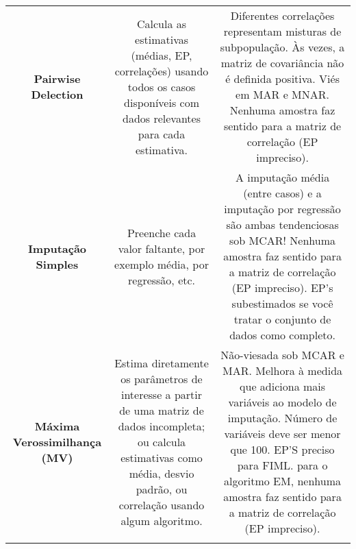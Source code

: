\documentclass[
]{book}
\begin{document}
\begin{longtable}[]{@{}ccc@{}}
\begin{minipage}[t]{0.30\columnwidth}\centering
\textbf{Pairwise Delection}\strut
\end{minipage} & \begin{minipage}[t]{0.30\columnwidth}\centering
Calcula as estimativas (médias, EP, correlações) usando todos os casos disponíveis com dados relevantes para cada estimativa.\strut
\end{minipage} & \begin{minipage}[t]{0.30\columnwidth}\centering
Diferentes correlações representam misturas de subpopulação. Às vezes, a matriz de covariância não é definida positiva. Viés em MAR e MNAR. Nenhuma amostra faz sentido para a matriz de correlação (EP impreciso).\strut
\end{minipage}\tabularnewline
\begin{minipage}[t]{0.30\columnwidth}\centering
\textbf{Imputação Simples}\strut
\end{minipage} & \begin{minipage}[t]{0.30\columnwidth}\centering
Preenche cada valor faltante, por exemplo média, por regressão, etc.\strut
\end{minipage} & \begin{minipage}[t]{0.30\columnwidth}\centering
A imputação média (entre casos) e a imputação por regressão são ambas tendenciosas sob MCAR! Nenhuma amostra faz sentido para a matriz de correlação (EP impreciso). EP's subestimados se você tratar o conjunto de dados como completo.\strut
\end{minipage}\tabularnewline
\begin{minipage}[t]{0.30\columnwidth}\centering
\textbf{Máxima Verossimilhança (MV)}\strut
\end{minipage} & \begin{minipage}[t]{0.30\columnwidth}\centering
Estima diretamente os parâmetros de interesse a partir de uma matriz de dados incompleta; ou calcula estimativas como média, desvio padrão, ou correlação usando algum algoritmo.\strut
\end{minipage} & \begin{minipage}[t]{0.30\columnwidth}\centering
Não-viesada sob MCAR e MAR. Melhora à medida que adiciona mais variáveis ao modelo de imputação. Número de variáveis deve ser menor que 100. EP'S preciso para FIML. para o algoritmo EM, nenhuma amostra faz sentido para a matriz de correlação (EP impreciso).\strut
\end{minipage}\tabularnewline
\begin{minipage}[t]{0.30\columnwidth}\centering

\end{minipage}
\end{longtable}
\end{document}
